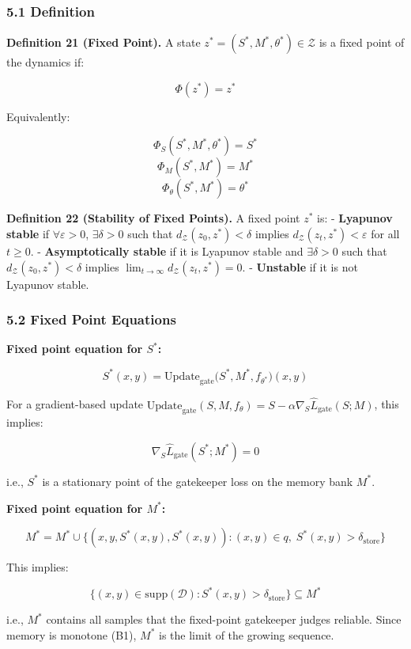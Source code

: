 \documentclass[
  12pt,
]{article}
\begin{document}
\subsubsection{5.1 Definition}\label{definition-2}

\textbf{Definition 21 (Fixed Point).} A state
\(z^* = (S^*, M^*, \theta^*) \in \mathcal{Z}\) is a fixed point of the
dynamics if:

\[\Phi(z^*) = z^*\]

Equivalently:

\[\Phi_S(S^*, M^*, \theta^*) = S^*\] \[\Phi_M(S^*, M^*) = M^*\]
\[\Phi_\theta(S^*, M^*) = \theta^*\]

\textbf{Definition 22 (Stability of Fixed Points).} A fixed point
\(z^*\) is: - \textbf{Lyapunov stable} if \(\forall \varepsilon > 0\),
\(\exists \delta > 0\) such that \(d_{\mathcal{Z}}(z_0, z^*) < \delta\)
implies \(d_{\mathcal{Z}}(z_t, z^*) < \varepsilon\) for all
\(t \geq 0\). - \textbf{Asymptotically stable} if it is Lyapunov stable
and \(\exists \delta > 0\) such that
\(d_{\mathcal{Z}}(z_0, z^*) < \delta\) implies
\(\lim_{t\to\infty} d_{\mathcal{Z}}(z_t, z^*) = 0\). - \textbf{Unstable}
if it is not Lyapunov stable.

\subsubsection{5.2 Fixed Point Equations}\label{fixed-point-equations}

\textbf{Fixed point equation for \(S^*\):}

\[S^*(x, y) = \text{Update}_{\text{gate}}\bigl(S^*, M^*, f_{\theta^*}\bigr)(x, y)\]

For a gradient-based update
\(\text{Update}_{\text{gate}}(S, M, f_\theta) = S - \alpha \nabla_S \hat{L}_{\text{gate}}(S; M)\),
this implies:

\[\nabla_S \hat{L}_{\text{gate}}(S^*; M^*) = 0\]

i.e., \(S^*\) is a stationary point of the gatekeeper loss on the memory
bank \(M^*\).

\textbf{Fixed point equation for \(M^*\):}

\[M^* = M^* \cup \{(x, y, S^*(x,y), S^*(x,y)) : (x,y) \in q, \; S^*(x,y) > \delta_{\text{store}}\}\]

This implies:

\[\{ (x,y) \in \text{supp}(\mathcal{D}) : S^*(x,y) > \delta_{\text{store}} \} \subseteq M^*\]

i.e., \(M^*\) contains all samples that the fixed-point gatekeeper
judges reliable. Since memory is monotone (B1), \(M^*\) is the limit of
the growing sequence.
\end{document}
